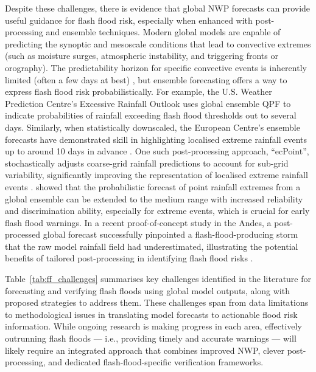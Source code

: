 Despite these challenges, there is evidence that global NWP forecasts can provide useful guidance for flash flood risk, especially when enhanced with post-processing and ensemble techniques. Modern global models are capable of predicting the synoptic and mesoscale conditions that lead to convective extremes (such as moisture surges, atmospheric instability, and triggering fronts or orography). The predictability horizon for specific convective events is inherently limited (often a few days at best) \citep{Collier2007}, but ensemble forecasting offers a way to express flash flood risk probabilistically. For example, the U.S. Weather Prediction Centre’s Excessive Rainfall Outlook uses global ensemble QPF to indicate probabilities of rainfall exceeding flash flood thresholds out to several days. Similarly, when statistically downscaled, the European Centre’s ensemble forecasts have demonstrated skill in highlighting localised extreme rainfall events up to around 10 days in advance \citep{Hewson2021}. One such post-processing approach, “ecPoint”, stochastically adjusts coarse-grid rainfall predictions to account for sub-grid variability, significantly improving the representation of localised extreme rainfall events \citep{Hewson2021}. \citet{Hewson2021} showed that the probabilistic forecast of point rainfall extremes from a global ensemble can be extended to the medium range with increased reliability and discrimination ability, especially for extreme events, which is crucial for early flash flood warnings. In a recent proof-of-concept study in the Andes, a post-processed global forecast successfully pinpointed a flash-flood-producing storm that the raw model rainfall field had underestimated, illustrating the potential benefits of tailored post-processing in identifying flash flood risks \citep{Herman2018}.

Table~\ref{tab:ff_challenges} summarises key challenges identified in the literature for forecasting and verifying flash floods using global model outputs, along with proposed strategies to address them. These challenges span from data limitations to methodological issues in translating model forecasts to actionable flood risk information. While ongoing research is making progress in each area, effectively outrunning flash floods --- i.e., providing timely and accurate warnings --- will likely require an integrated approach that combines improved NWP, clever post-processing, and dedicated flash-flood-specific verification frameworks.

